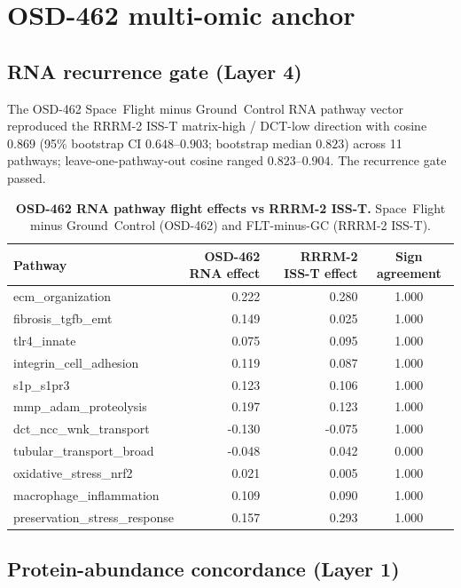 \documentclass[10pt]{article}
\begin{document}
\section{OSD-462 multi-omic anchor}

\subsection{RNA recurrence gate (Layer 4)}

The OSD-462 Space~Flight minus Ground~Control RNA pathway vector reproduced the RRRM-2 ISS-T matrix-high / DCT-low direction with cosine $0.869$ (95\% bootstrap CI $0.648$--$0.903$; bootstrap median $0.823$) across 11 pathways; leave-one-pathway-out cosine ranged $0.823$--$0.904$. The recurrence gate passed.

\begin{table}[H]
\centering\small
\caption{\textbf{OSD-462 RNA pathway flight effects vs RRRM-2 ISS-T.} Space~Flight minus Ground~Control (OSD-462) and FLT-minus-GC (RRRM-2 ISS-T).}
\label{tab:rnapath}
\begin{tabular}{lrrc}
\toprule
Pathway & OSD-462 RNA effect & RRRM-2 ISS-T effect & Sign agreement \\
\midrule
ecm\_organization & 0.222 & 0.280 & 1.000 \\
fibrosis\_tgfb\_emt & 0.149 & 0.025 & 1.000 \\
tlr4\_innate & 0.075 & 0.095 & 1.000 \\
integrin\_cell\_adhesion & 0.119 & 0.087 & 1.000 \\
s1p\_s1pr3 & 0.123 & 0.106 & 1.000 \\
mmp\_adam\_proteolysis & 0.197 & 0.123 & 1.000 \\
dct\_ncc\_wnk\_transport & -0.130 & -0.075 & 1.000 \\
tubular\_transport\_broad & -0.048 & 0.042 & 0.000 \\
oxidative\_stress\_nrf2 & 0.021 & 0.005 & 1.000 \\
macrophage\_inflammation & 0.109 & 0.090 & 1.000 \\
preservation\_stress\_response & 0.157 & 0.293 & 1.000 \\
\bottomrule
\end{tabular}
\end{table}

\subsection{Protein-abundance concordance (Layer 1)}
\end{document}
